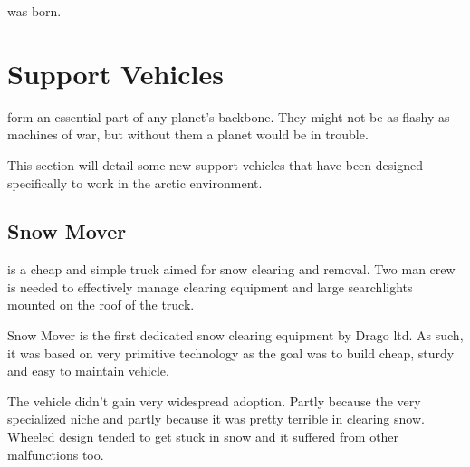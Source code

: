 \documentclass{tufte-book}
\begin{document}
 was born.

\chapter{Support Vehicles}
\label{ch:support-vehicles}


 form an essential part of any planet's
backbone. They might not be as flashy as machines of war, but without
them a planet would be in trouble.

This section will detail some new support vehicles that have been
designed specifically to work in the arctic environment.



\section{Snow Mover}
 is a cheap and simple truck aimed for snow clearing and
removal. Two man crew is needed to effectively manage clearing equipment
and large searchlights mounted on the roof of the truck.

Snow Mover is the first dedicated snow clearing equipment by Drago ltd. As
such, it was based on very primitive technology as the goal was to build
cheap, sturdy and easy to maintain vehicle.

The vehicle didn't gain very widespread adoption. Partly because the very
specialized niche and partly because it was pretty terrible in clearing
snow. Wheeled design tended to get stuck in snow and it suffered from
other malfunctions too.
\end{document}
